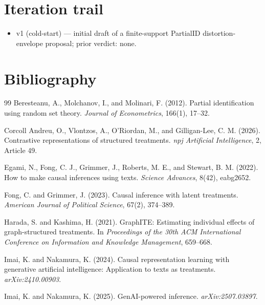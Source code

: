 \documentclass[11pt]{article}
\theoremstyle{definition}
\theoremstyle{plain}
\theoremstyle{remark}
\begin{document}
\section{Iteration trail}
\begin{itemize}[leftmargin=*]
\item v1 (cold-start) --- initial draft of a finite-support PartialID distortion-envelope proposal; prior verdict: none.
\end{itemize}

\section*{Bibliography}
\begin{thebibliography}{99}
Beresteanu, A., Molchanov, I., and Molinari, F. (2012).
Partial identification using random set theory.
\emph{Journal of Econometrics}, 166(1), 17--32.

Corcoll Andreu, O., Vlontzos, A., O'Riordan, M., and Gilligan-Lee, C. M. (2026).
Contrastive representations of structured treatments.
\emph{npj Artificial Intelligence}, 2, Article 49.

Egami, N., Fong, C. J., Grimmer, J., Roberts, M. E., and Stewart, B. M. (2022).
How to make causal inferences using texts.
\emph{Science Advances}, 8(42), eabg2652.

Fong, C. and Grimmer, J. (2023).
Causal inference with latent treatments.
\emph{American Journal of Political Science}, 67(2), 374--389.

Harada, S. and Kashima, H. (2021).
GraphITE: Estimating individual effects of graph-structured treatments.
In \emph{Proceedings of the 30th ACM International Conference on Information and Knowledge Management}, 659--668.

Imai, K. and Nakamura, K. (2024).
Causal representation learning with generative artificial intelligence: Application to texts as treatments.
\emph{arXiv:2410.00903}.

Imai, K. and Nakamura, K. (2025).
GenAI-powered inference.
\emph{arXiv:2507.03897}.


\end{thebibliography}
\end{document}
